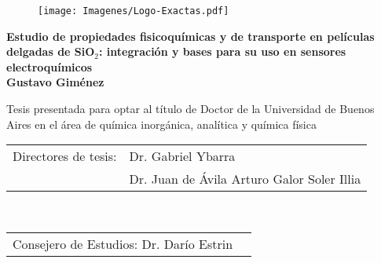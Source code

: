 \begin{titlepage}


		\begin{center}
		\end{center}

		\begin{figure}[ht!]
		\centering
		\texttt{[image: Imagenes/Logo-Exactas.pdf]}%
	 	\end{figure}

	 	\begin{center}
	 	\large{\bfseries{Estudio de propiedades fisicoquímicas y de transporte en películas delgadas de SiO$_2$: integración y bases para su uso en sensores electroquímicos}} \\ \vspace*{1.2cm}
	 	\Large{\bfseries{Gustavo Giménez}} \\ \vspace*{1.2cm}
	 	
	 	\normalsize{Tesis presentada para optar al título de Doctor de la Universidad de Buenos Aires en el área de química inorgánica, analítica y química física} \\ 
	 	\end{center}
		
		\vspace*{1cm}

		\setlength\tabcolsep{1.5pt}
		\noindent\begin{tabular}{@{}ll}
		Directores de tesis:&Dr. Gabriel Ybarra\\  %
		 &Dr. Juan de Ávila Arturo Galor Soler Illia\\						%
		\end{tabular} \\
		\noindent\begin{tabular}{@{}ll}
		Consejero de Estudios: Dr. Darío Estrin \\ %
		\end{tabular} \\ 


\end{titlepage}

